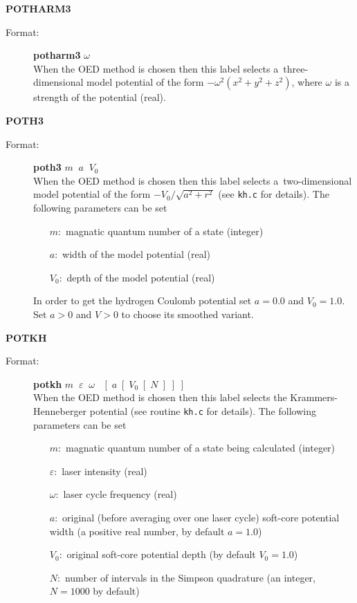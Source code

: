 \documentclass[12pt,a4paper]{article}
\newcommand{\ft}[1]{\texttt{#1}}
\begin{document}
\begin{description}
\item \textbf{POTHARM3}
\begin{description} 
\item[Format:] \textbf{potharm3} $\omega$ \\ When the OED method is chosen then this label
  selects a~three-dimensional model potential of the form $-\omega^2(x^2+y^2+z^2)$, where
  $\omega$ is a strength of the potential (real).
\end{description}



\item \textbf{POTH3}
\begin{description} 
\item[Format:] \textbf{poth3} $m\;\;a\;\;V_0$ \\ When the OED method is chosen then this
  label selects a~two-dimensional model potential of the form $ -V_0/\sqrt{a^2+r^2}$ (see
  \ft{kh.c} for details). The following parameters can be set

\begin{itemize} 
\item [$m:$] magnatic quantum number of a state (integer)
\item [$a:$] width of the model potential (real)
\item [$V_0:$] depth of the model potential (real)
\end{itemize} 
In order to get the hydrogen Coulomb potential set $a=0.0$ and
$V_0=1.0$. Set $a>0$ and $V>0$ to choose its smoothed variant.

\end{description}


\item \textbf{POTKH}
\begin{description} 
\item[Format:] \textbf{potkh}
  $m\;\;\varepsilon\;\;\omega\;\;\;[\;a\;[\;V_0\;[\;N\;]\;]\;]$ \\ When the OED method is
  chosen then this label selects the Krammers-Henneberger potential (see routine \ft{kh.c} for
  details). The following parameters can be set
\begin{itemize} 
\item [$m:$] magnatic quantum number of a state being calculated (integer)
\item [$\varepsilon:$] laser intensity (real)
\item [$\omega:$] laser cycle frequency (real)
\item [$a:$] original (before averaging over one laser cycle)
  soft-core potential width (a positive real number, by default $a=1.0$)
\item [$V_0:$] original soft-core potential depth (by default $V_0=1.0$)
\item [$N:$] number of intervals in the Simpson quadrature (an
  integer, $N=1000$ by default)
\end{itemize} 
\end{description} 



\end{description}
\end{document}
